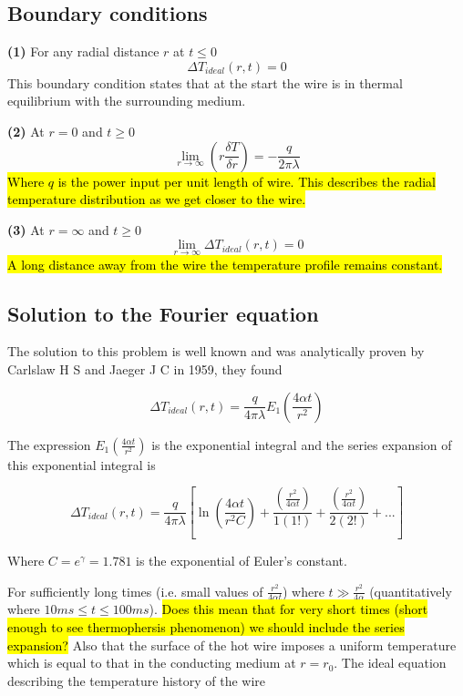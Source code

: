 \documentclass{article}
\begin{document}
\subsection{Boundary conditions}
\textbf{(1)} For any radial distance $r$ at $t \leq 0$ 
$$\Delta T_{ideal} (r, t) = 0$$
This boundary condition states that at the start the wire is in thermal equilibrium with the surrounding medium.

\vspace{3mm}

\textbf{(2)} At $r = 0 $ and $t \geq 0$
$$ \displaystyle \lim_{r\to \infty} \left(r \frac{\delta T}{\delta r} \right) = -\frac{q}{2 \pi \lambda}$$
\hl{Where $q$ is the power input per unit length of wire. This describes the radial temperature distribution as we get closer to the wire.}

\newpage

\textbf{(3)} At $r = \infty$ and $t \geq 0$ 
$$\displaystyle \lim_{r\to \infty} \Delta T_{ideal}(r,t) = 0$$
\hl{A long distance away from the wire the temperature profile remains constant.}

\subsection{Solution to the Fourier equation}

The solution to this problem is well known and was analytically proven by Carlslaw H S and Jaeger J C in 1959, they found

$$\Delta T_{ideal}(r,t) =  \frac{q}{4 \pi \lambda}  E_1 \left( \frac{4 \alpha t}{r^2}\right)$$

The expression $E_1 \left( \frac{4 \alpha t}{r^2}\right)$ is the exponential integral and the series expansion of this exponential integral is 

$$\Delta T_{ideal}(r,t) = \frac{q}{4 \pi \lambda} \left[ \ln \left( \frac{4 \alpha t}{r^2 C}\right) + \frac{\left( \frac{r^2}{4 \alpha t} \right)}{1(1!)} + \frac{\left( \frac{r^2}{4 \alpha t} \right)}{2(2!)} + ... \right]$$

Where $ C = e^{\gamma} = 1.781 $ is the exponential of Euler's constant. 

\vspace{3mm}

For sufficiently long times (i.e. small values of $\frac{r^2}{4 \alpha t}$) where $t \gg \frac{r^2}{4 \alpha}$ (quantitatively where $10ms \le t \le 100ms$). \hl{Does this mean that for very short times (short enough to see thermophersis phenomenon) we should include the series expansion?} Also that the surface of the hot wire imposes a uniform temperature which is equal to that in the conducting medium at $r = r_0$. The ideal equation describing the temperature history of the wire 
\end{document}
